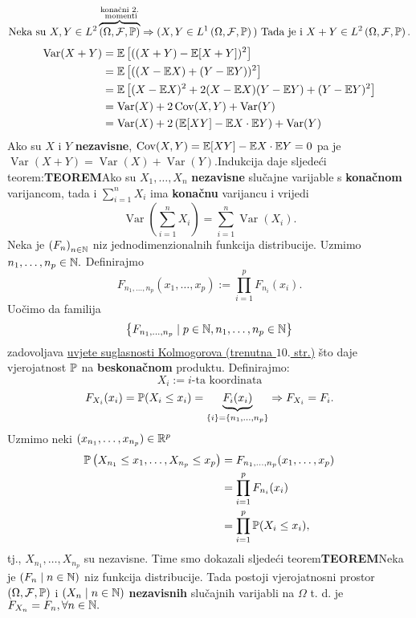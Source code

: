 \documentclass{article}
\newcommand{\Var}{\operatorname{Var}}
\newcommand{\Cov}{\operatorname{Cov}}
\begin{document}
\(\begin{aligned}\text{Neka su }X,Y\in L^2\overbrace{\left(\Omega,\mathcal F,\Bbb P\right)}^{\substack{\text{konačni }2.\\\text{ momenti}}}\Rightarrow\text{(} X,Y\in L^1\left(\Omega,\mathcal F,\Bbb P\right)\text{) Tada je i }X+Y\in L^2\left(\Omega,\mathcal F,\Bbb P\right).\end{aligned}\)\[\begin{aligned}\Var (X+Y)&=\Bbb E\left[((X+Y)-\Bbb E[X+Y])^2\right]\\&=\Bbb E\left[((X-\Bbb EX)+(Y-\Bbb EY))^2\right]\\&=\Bbb E\left[(X-\Bbb EX)^2+2(X-\Bbb EX)(Y-\Bbb EY)+(Y-\Bbb EY)^2\right]\\&=\Var (X)+2\Cov (X,Y)+\Var (Y)\\&=\Var (X)+2\left(\Bbb E[XY]-\Bbb EX\cdot\Bbb EY\right)+\Var (Y)\end{aligned}\] Ako su \(X\) i \(Y\) \textbf{nezavisne}, \(\Cov (X,Y)=\Bbb E[XY]-\Bbb EX\cdot\Bbb EY=0\) pa je \(\Var (X+Y)=\Var (X)+\Var (Y).\)\newline\newline Indukcija daje sljedeći teorem:\newline\newline\textbf{TEOREM}\newline Ako su \(X_1,\ldots,X_n\) \textbf{nezavisne} slučajne varijable s \textbf{konačnom} varijancom, tada i \(\sum_{i=1}^nX_i\) ima \textbf{konačnu} varijancu i vrijedi \[\Var \left(\sum_{i=1}^nX_i\right)=\sum_{i=1}^n\Var (X_i).\]
Neka je \(\left(F_n\right)_{n\in\Bbb N}\) niz jednodimenzionalnih funkcija distribucije. Uzmimo \(n_1,\ldots,n_p\in\Bbb N.\) Definirajmo \[F_{n_1,\ldots,n_p}(x_1,\ldots,x_p):=\prod_{i=1}^pF_{n_i}(x_i).\] Uočimo da familija \[\left\{F_{n_1,\ldots,n_p}\mid p\in\Bbb N,n_1,\ldots,n_p\in\Bbb N\right\}\] zadovoljava \underline{uvjete suglasnosti Kolmogorova (trenutna \(10.\) str.)} što daje vjerojatnost \(\Bbb P\) na \textbf{beskonačnom} produktu. Definirajmo: \[X_i:=i\text{-ta koordinata}\] \[F_{X_i}(x_i)=\Bbb P(X_i\le x_i)=\underbrace{F_i(x_i)}_{\{i\}=\{n_1,\ldots,n_p\}}\Rightarrow F_{X_i}=F_i.\] Uzmimo neki \((x_{n_1},\ldots,x_{n_p})\in\Bbb R^p\) \[\begin{aligned}\Bbb P\left(X_{n_1}\le x_1,\ldots,X_{n_p}\le x_p\right)&=F_{n_1,\ldots,n_p}(x_1,\ldots,x_p)\\&=\prod_{i=1}^pF_{n_i}(x_i)\\&=\prod_{i=1}^p\Bbb P(X_i\le x_i),\end{aligned}\] tj., \(X_{n_1},\ldots,X_{n_p}\) su nezavisne. Time smo dokazali sljedeći teorem\newline\textbf{TEOREM}\newline Neka je \(\left(F_n\mid n\in\Bbb N\right)\) niz funkcija distribucije. Tada postoji vjerojatnosni prostor \(\left(\Omega,\mathcal F,\Bbb P\right)\) i \(\left(X_n\mid n\in\Bbb N\right)\) \textbf{nezavisnih} slučajnih varijabli na \(\Omega\) t. d. je \(F_{X_n}=F_n,\forall n\in\Bbb N.\)\newpage  
\end{document}
